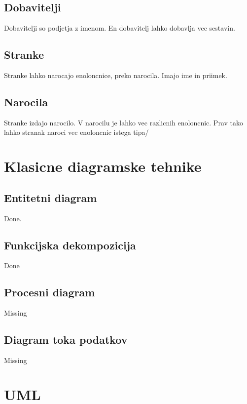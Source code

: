 \documentclass[12pt]{article}
\let\stdsection\section
\renewcommand\section{\newpage\stdsection}
\begin{document}
\subsection{Dobavitelji}

Dobavitelji so podjetja z imenom. En dobavitelj lahko dobavlja vec sestavin.

\subsection{Stranke}

Stranke lahko narocajo enoloncnice, preko narocila.
Imajo ime in priimek.

\subsection{Narocila}

Stranke izdajo narocilo. V narocilu je lahko vec razlicnih enoloncnic. Prav tako lahko stranak naroci vec enoloncnic istega tipa/  

\section{Klasicne diagramske tehnike}

\subsection{Entitetni diagram}

Done.

\subsection{Funkcijska dekompozicija}

Done 

\subsection{Procesni diagram}

Missing

\subsection{Diagram toka podatkov}

Missing

\section{UML}
\end{document}
